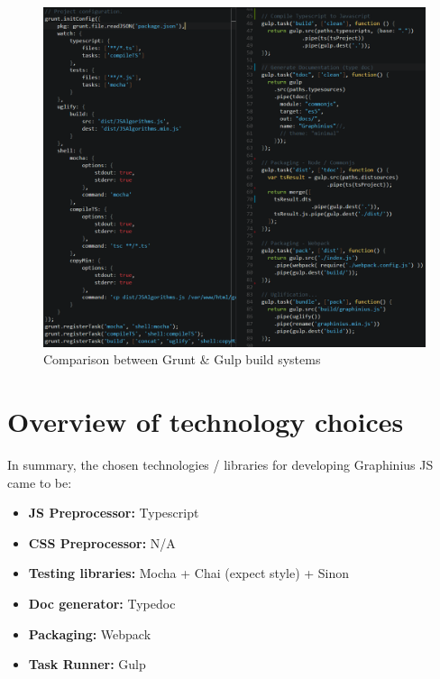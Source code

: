 	\begin{figure}[ht]
		\centering
		\hspace*{-1.1cm}
		\includegraphics[width=1.15\textwidth]{figures/grunt_gulp_comparison}
		\caption{Comparison between Grunt \& Gulp build systems}
		\label{fig:grunt_gulp}
	\end{figure}
	

\section{Overview of technology choices}
\label{sect:design_choices}

In summary, the chosen technologies / libraries for developing Graphinius JS came to be:

\begin{itemize}
	\item \textbf{JS Preprocessor:} Typescript
	\item \textbf{CSS Preprocessor:} N/A
	\item \textbf{Testing libraries:} Mocha + Chai (expect style) + Sinon
	\item \textbf{Doc generator:} Typedoc
	\item \textbf{Packaging:} Webpack
	\item \textbf{Task Runner:} Gulp
\end{itemize}
